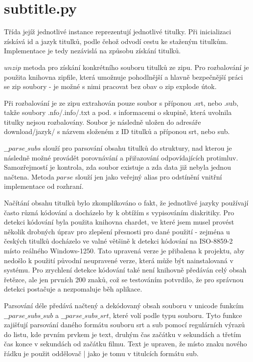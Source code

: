 \documentclass[a4paper,12]{article}
\begin{document}
\section*{subtitle.py}
Třída jejíž jednotlivé instance reprezentují jednotlivé titulky. Při inicializaci získává id a jazyk titulků, podle čehož odvodí cestu ke staženým titulkům. Implementace je tedy nezávislá na způsobu získání titulků.

$unzip$ metoda pro získání konkrétního souboru titulků ze zipu. Pro rozbalování je použita knihovna zipfile, která umožnuje pohodlnější a hlavně bezpečnější práci se zip soubory - je možné s nimi pracovat bez obav o zip explode útok.

Při rozbalování je ze zipu extrahován pouze soubor s příponou .srt, nebo .sub, takže soubory .nfo/.info/.txt a pod. s informacemi o skupině, která uvolnila titulky nejsou rozbalovány. Soubor je následně uložen do adresáře download/jazyk/ s názvem složeném z ID titulků a příponou srt, nebo sub.

$\_\_parse\_subs$ slouží pro parsování obsahu titulků do struktury, nad kterou je následně možné provádět porovnávání a přiřazování odpovídajících protimluv. Samozřejmostí je kontrola, zda soubor existuje a zda data již nebyla jednou načtena. Metoda $parse$ slouží jen jako veřejný alias pro odstínění vnitřní implementace od rozhraní.

Načítání obsahu titulků bylo zkomplikováno o fakt, že jednotlivé jazyky používají často různá kódování a docházelo by k obtížím s vypisováním diakritiky. Pro detekci kódování byla použita knihovna chardet, ve které jsem musel provést několik drobných úprav pro zlepšení přesnosti pro dané použití - zejména u českých titulků docházelo ve valné většině k detekci kódování na ISO-8859-2 místo reálného Windows-1250. Tato upravená verze je přibalena k projektu, aby nedošlo k použití původní neupravené verze, která může být nainstalovaná v systému. Pro zrychlení detekce kódování také není knihovně předáván celý obsah řetězce, ale jen prvních 200 znaků, což se testováním potvrdilo, že pro správnou detekci postačuje a nezpomaluje běh aplikace.

Parsování déle předává načtený a dekódovaný obsah souboru v unicode funkcím $\_\_parse\_subs\_sub$ a $\_\_parse\_subs\_srt$, které volí podle typu souboru. Tyto funkce zajišťují parsování daného formátu souboru srt a sub pomocí regulárních výrazů do listu, kde prvním prvkem je text, druhým čas začátku v sekundách a třetím čas konce v sekundách od začátku filmu. Text je upraven, že místo znaku nového řádku je použit oddělovač | jako je tomu v titulcích formátu sub.
\end{document}
